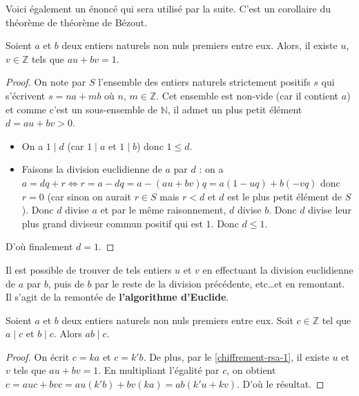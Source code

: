   Voici également un énoncé qui sera utilisé par la suite. C'est un corollaire du théorème de théorème de Bézout.

  \begin{proposition}
    \label{chiffrement-rsa-1}
    Soient $a$ et $b$ deux entiers naturels non nuls premiers entre eux. Alors, il existe $u$, $v \in \mathbb{Z}$ tels que $au + bv = 1$.
  \end{proposition}

  \begin{proof}
    On note par $S$ l'ensemble des entiers naturels strictement positifs $s$ qui s'écrivent $s = na + mb$ où $n$, $m \in \mathbb{Z}$. Cet ensemble est non-vide (car il contient $a$) et comme c'est un sous-ensemble de $\mathbb{N}$, il admet un plus petit élément $d = au + bv > 0$.
    \begin{itemize}
      \item On a $1 \mid d$ (car $1 \mid a$ et $1 \mid b$) donc $1 \leq d$.
      \item Faisons la division euclidienne de $a$ par $d$ : on a $a = dq + r \iff r = a - dq = a  - (au + bv)q = a(1 - uq) + b(-vq)$ donc $r = 0$ (car sinon on aurait $r \in S$ mais $r < d$ et $d$ est le plus petit élément de $S$). Donc $d$ divise $a$ et par le même raisonnement, $d$ divise $b$. Donc $d$ divise leur plus grand diviseur commun positif qui est $1$. Donc $d \leq 1$.
    \end{itemize}
    D'où finalement $d = 1$.
  \end{proof}

  \begin{remark}
    Il est possible de trouver de tels entiers $u$ et $v$ en effectuant la division euclidienne de $a$ par $b$, puis de $b$ par le reste de la division précédente, etc\dots et en remontant. Il s'agit de la remontée de \textbf{l'algorithme d'Euclide}.
  \end{remark}

  \begin{corollary}
    \label{chiffrement-rsa-2}
    Soient $a$ et $b$ deux entiers naturels non nuls premiers entre eux. Soit $c \in \mathbb{Z}$ tel que $a \mid c$ et $b \mid c$. Alors $ab \mid c$.
  \end{corollary}

  \begin{proof}
    On écrit $c = ka$ et $c = k'b$. De plus, par le \cref{chiffrement-rsa-1}, il existe $u$ et $v$ tels que $au + bv = 1$. En multipliant l'égalité par $c$, on obtient $c = auc + bvc = au(k'b) + bv(ka) = ab(k'u+kv)$. D'où le résultat.
  \end{proof}

